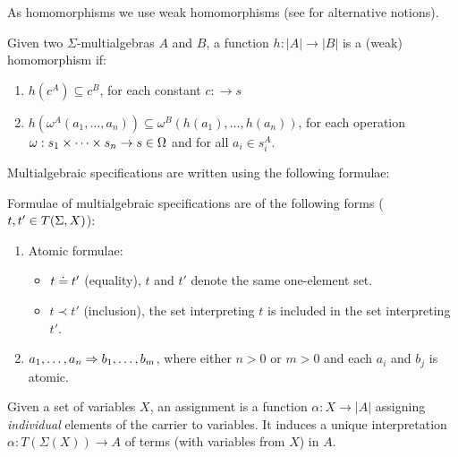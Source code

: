 \documentclass[10pt]{article}
\begin{document}
As homomorphisms we use weak homomorphisms (see
\cite{catrel} for alternative notions).
\begin{definition}Given two $\Sigma$-multialgebras $A$ and $B$, 
a function $h: |A| \to |B|$ is a (weak) homomorphism if:
\begin{enumerate}\MyLPar
\item $h(c^A) \subseteq c^B$, for each constant $c: \to s$ 
\item $h(\omega^A(a_1, \ldots ,a_n)) \subseteq\omega^B(h(a_1), \ldots ,h(a_n))$,
for each operation  $\omega:s_1\times\cdots\times s_n\to s\in\Omega$ and for all $a_i \in s_{i}^A$.
\end{enumerate}
\end{definition}
Multialgebraic specifications are written using the following formulae:
%
\begin{definition}
Formulae of multialgebraic specifications are of the following forms ($t,t'\in T(\Sigma,X)$):
\begin{enumerate}\MyLPar
\item Atomic formulae:
\begin{itemize}\MyLPar
\item $t \mathrel{\dot{=} }  t'$ (equality), $t$ and $t'$ denote the same one-element set.
\item $t \prec t'$ (inclusion), the set interpreting $t$ is included in
the set interpreting $t'$.
\end{itemize}
\item $a_1, \ldots ,a_n \Rightarrow b_1, \ldots ,b_m$, where either $n>0$ or $m>0$ and
each $a_i$ and $b_j$ is atomic.
\end{enumerate}
\end{definition}
%
Given a set of variables $X$, an assignment is a function $\alpha: X \to |A|$ 
assigning {\em individual\/} elements of the carrier to variables. It
induces a unique
interpretation ${\alpha}: T(\Sigma(X)) \to A$ of terms
(with variables from $X$) in $A$. 
\end{document}
